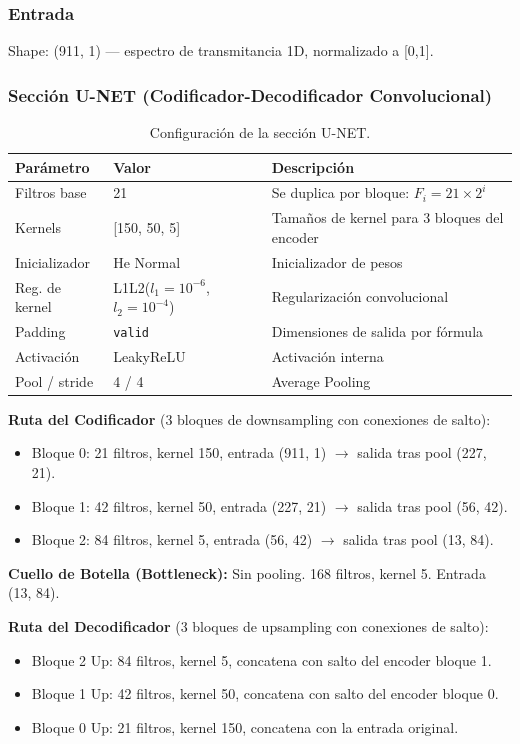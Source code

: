 \documentclass{article}
\begin{document}
\subsubsection{Entrada}
Shape: (911, 1) — espectro de transmitancia 1D, normalizado a [0,1].

\subsubsection{Sección U-NET (Codificador-Decodificador Convolucional)}

\begin{table}[htbp]
\centering
\caption{Configuración de la sección U-NET.}
\label{tab:unet-config}
\begin{tabular}{lll}
\hline
Parámetro & Valor & Descripción \\
\hline
Filtros base & 21 & Se duplica por bloque: $F_i = 21 \times 2^i$ \\
Kernels & [150, 50, 5] & Tamaños de kernel para 3 bloques del encoder \\
Inicializador & He Normal & Inicializador de pesos \\
Reg. de kernel & L1L2($l_1=10^{-6}$, $l_2=10^{-4}$) & Regularización convolucional \\
Padding & \texttt{valid} & Dimensiones de salida por fórmula \\
Activación & LeakyReLU & Activación interna \\
Pool / stride & 4 / 4 & Average Pooling \\
\hline
\end{tabular}
\end{table}

\textbf{Ruta del Codificador} (3 bloques de downsampling con conexiones de salto):
\begin{itemize}
\item Bloque 0: 21 filtros, kernel 150, entrada (911, 1) $\rightarrow$ salida tras pool (227, 21).
\item Bloque 1: 42 filtros, kernel 50, entrada (227, 21) $\rightarrow$ salida tras pool (56, 42).
\item Bloque 2: 84 filtros, kernel 5, entrada (56, 42) $\rightarrow$ salida tras pool (13, 84).
\end{itemize}

\textbf{Cuello de Botella (Bottleneck):} Sin pooling. 168 filtros, kernel 5. Entrada (13, 84).

\textbf{Ruta del Decodificador} (3 bloques de upsampling con conexiones de salto):
\begin{itemize}
\item Bloque 2 Up: 84 filtros, kernel 5, concatena con salto del encoder bloque 1.
\item Bloque 1 Up: 42 filtros, kernel 50, concatena con salto del encoder bloque 0.
\item Bloque 0 Up: 21 filtros, kernel 150, concatena con la entrada original.
\end{itemize}
\end{document}
